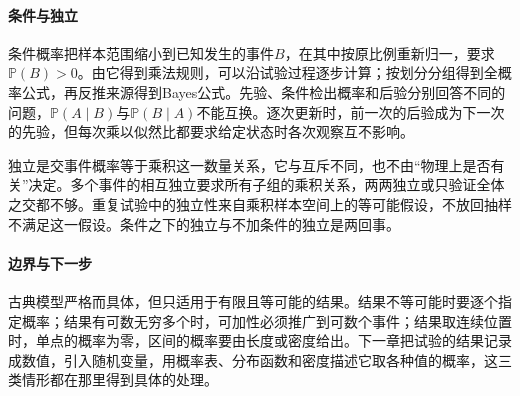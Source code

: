\paragraph{条件与独立}
条件概率把样本范围缩小到已知发生的事件$B$，在其中按原比例重新归一，要求$\mathbb{P}(B)>0$。由它得到乘法规则，可以沿试验过程逐步计算；按划分分组得到全概率公式，再反推来源得到Bayes公式。先验、条件检出概率和后验分别回答不同的问题，$\mathbb{P}(A\mid B)$与$\mathbb{P}(B\mid A)$不能互换。逐次更新时，前一次的后验成为下一次的先验，但每次乘以似然比都要求给定状态时各次观察互不影响。

独立是交事件概率等于乘积这一数量关系，它与互斥不同，也不由“物理上是否有关”决定。多个事件的相互独立要求所有子组的乘积关系，两两独立或只验证全体之交都不够。重复试验中的独立性来自乘积样本空间上的等可能假设，不放回抽样不满足这一假设。条件之下的独立与不加条件的独立是两回事。

\paragraph{边界与下一步}
古典模型严格而具体，但只适用于有限且等可能的结果。结果不等可能时要逐个指定概率；结果有可数无穷多个时，可加性必须推广到可数个事件；结果取连续位置时，单点的概率为零，区间的概率要由长度或密度给出。下一章把试验的结果记录成数值，引入随机变量，用概率表、分布函数和密度描述它取各种值的概率，这三类情形都在那里得到具体的处理。
